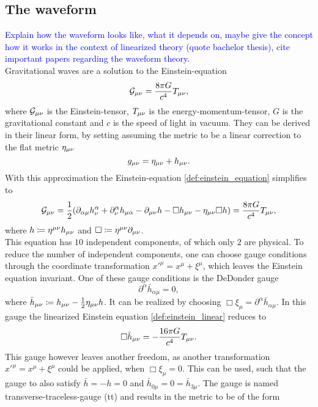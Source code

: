 \subsection{The waveform}
\textcolor{blue}{Explain how the waveform looks like, what it depends on, maybe give the concept how it works in the context of linearized theory (quote bachelor thesis), cite important papers regarding the waveform theory.}\\
Gravitational waves are a solution to the Einstein-equation
\begin{equation}\label{def:einstein_equation}
\mathcal{G}_{\mu\nu} = \frac{8\pi G}{c^4}T_{\mu\nu},
\end{equation}
where $\mathcal{G}_{\mu\nu}$ is the Einstein-tensor, $T_{\mu\nu}$ is the energy-momentum-tensor, $G$ is the gravitational constant and $c$ is the speed of light in vacuum. They can be derived in their linear form, by setting assuming the metric to be a linear correction to the flat metric $\eta_{\mu\nu}$
\begin{equation}\label{def:linear_approximation}
g_{\mu\nu} = \eta_{\mu\nu} + h_{\mu\nu}.
\end{equation}
With this approximation the Einstein-equation \eqref{def:einstein_equation} simplifies to
\begin{equation}\label{def:einstein_linear}
\mathcal{G}_{\mu\nu}=\frac{1}{2}{\left( \partial_{\alpha\mu}h^\alpha_\nu+\partial^\alpha_\nu h_{\mu\alpha} - \partial_{\mu\nu} h- \Box h_{\mu\nu} - \eta_{\mu\nu}\Box h \right)} = \frac{8\pi G}{c^4}T_{\mu\nu},
\end{equation}
where $h\coloneqq\eta^{\mu\nu} h_{\mu\nu}$ and $\Box\coloneqq\eta^{\mu\nu}\partial_{\mu\nu}$.\\
This equation has $10$ independent components, of which only $2$ are physical. To reduce the number of independent components, one can choose gauge conditions through the coordinate transformation ${x'}^\mu=x^\mu+\xi^\mu$, which leaves the Einstein equation invariant. One of these gauge conditions is the DeDonder gauge
\begin{equation}
\partial^\alpha \bar{h}_{\alpha\mu} = 0,
\end{equation}
where $\bar{h}_{\mu\nu}\coloneqq h_{\mu\nu} - \frac{1}{2}\eta_{\mu\nu} h$. It can be realized by choosing $\Box\xi_\mu =\partial^\alpha \bar{h}_{\alpha\mu}$. In this gauge the linearized Einstein equation \eqref{def:einstein_linear} reduces to
\begin{equation}\label{def:gw_equation}
\Box\bar{h}_{\mu\nu}=-\frac{16\pi G}{c^4}T_{\mu\nu}.
\end{equation}
This gauge however leaves another freedom, as another transformation ${x'}^\mu=x^\mu+\xi^\mu$ could be applied, when $\Box\xi_\mu =0$. This can be used, such that the gauge to also satisfy $\bar{h}=-h=0$ and $\bar{h}_{0\mu} = 0 = \bar{h}_{3\mu}$. The gauge is named transverse-traceless-gauge (\gls{tt}) and results in the metric to be of the form
